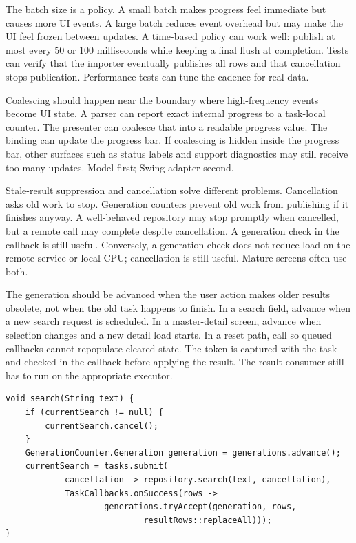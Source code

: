 The batch size is a policy. A small batch makes progress feel immediate but
causes more UI events. A large batch reduces event overhead but may make the UI
feel frozen between updates. A time-based policy can work well: publish at most
every 50 or 100 milliseconds while keeping a final flush at completion. Tests
can verify that the importer eventually publishes all rows and that cancellation
stops publication. Performance tests can tune the cadence for real data.

Coalescing should happen near the boundary where high-frequency events become
UI state. A parser can report exact internal progress to a task-local counter.
The presenter can coalesce that into a readable progress value. The binding can
update the progress bar. If coalescing is hidden inside the progress bar, other
surfaces such as status labels and support diagnostics may still receive too
many updates. Model first; Swing adapter second.

Stale-result suppression and cancellation solve different problems. Cancellation
asks old work to stop. Generation counters prevent old work from publishing if
it finishes anyway. A well-behaved repository may stop promptly when cancelled,
but a remote call may complete despite cancellation. A generation check in the
callback is still useful. Conversely, a generation check does not reduce load
on the remote service or local CPU; cancellation is still useful. Mature
screens often use both.

The generation should be advanced when the user action makes older results
obsolete, not when the old task happens to finish. In a search field, advance
when a new search request is scheduled. In a master-detail screen, advance
when selection changes and a new detail load starts. In a reset path, call
 so queued callbacks cannot repopulate cleared state. The
token is captured with the task and checked in the callback before applying
the result. The result consumer still has to run on the appropriate executor.

\begin{lstlisting}[caption={Search result suppression with cancellation and generation.}]
void search(String text) {
    if (currentSearch != null) {
        currentSearch.cancel();
    }
    GenerationCounter.Generation generation = generations.advance();
    currentSearch = tasks.submit(
            cancellation -> repository.search(text, cancellation),
            TaskCallbacks.onSuccess(rows ->
                    generations.tryAccept(generation, rows,
                            resultRows::replaceAll)));
}
\end{lstlisting}

